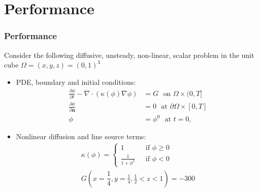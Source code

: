 \documentclass{beamer}
\begin{document}

\section{Performance}

\newcommand{\onehalf}{\frac{1}{2}}
\newcommand{\pder}[2]{\ensuremath{\frac{\partial#1}{\partial#2}}}

\begin{frame}
  \frametitle{Performance}
  Consider the following diffusive, unsteady, non-linear, scalar
  problem in the unit cube $\Omega=(x,y,z)=(0,1)^3$
  \begin{itemize}
  \item PDE, boundary and initial conditions:
    \begin{equation}
      \begin{aligned}
        \pder{\phi}{t}-\nabla \cdot \left(\kappa(\phi)\nabla \phi \right) &= G
        ~~~\text{on $\Omega \times (0,T]$}\\
        \pder{\phi}{\mathbf{n}} &= 0 
        ~~~\text{at $\partial\Omega \times [0,T]$}\\
        \phi &= \phi^0
        ~~~\text{at $t=0$},
      \end{aligned}
    \end{equation}
  \item Nonlinear diffusion and line source terms:
    \begin{equation} 
      \begin{aligned}
        \kappa(\phi)=
        \begin{cases}
          1 ~~~&\text{if } \phi \ge 0 \\
          \frac{1}{1+\phi^2} ~~~&\text{if } \phi < 0
        \end{cases}\\
        G(x=\dfrac{1}{4},y=\frac{1}{4},\frac{1}{2}<z<1) = -300
      \end{aligned}
    \end{equation}
  \end{itemize}
\end{frame}
\end{document}
